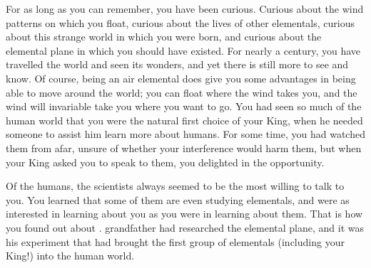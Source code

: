 \documentclass[char]{elementals}
\begin{document}
\name{\cNaturalist{}}

For as long as you can remember, you have been curious.  Curious about the wind patterns on which you float, curious about the lives of other elementals, curious about this strange world in which you were born, and curious about the elemental plane in which you should have existed.  For nearly a century, you have travelled the world and seen its wonders, and yet there is still more to see and know.  Of course, being an air elemental does give you some advantages in being able to move around the world; you can float where the wind takes you, and the wind will invariable take you where you want to go.  You had seen so much of the human world that you were the natural first choice of your King, \cairKing{\intro} when he needed someone to assist him learn more about humans.  For some time, you had watched them from afar, unsure of whether your interference would harm them, but when your King asked you to speak to them, you delighted in the opportunity.


Of the humans, the scientists always seemed to be the most willing to talk to you.  You learned that some of them are even studying elementals, and were as interested in learning about you as you were in learning about them.  That is how you found out about \cgrandDaughter{\intro}.  \cgrandDaughter{\Their} grandfather had researched the elemental plane, and it was his experiment that had brought the first group of elementals (including your King!) into the human world.  

\end{document}
